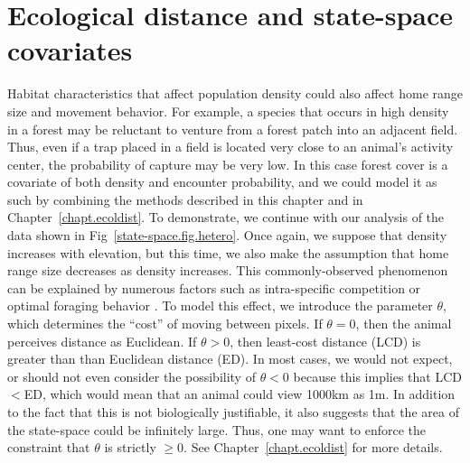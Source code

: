 \section{Ecological distance and state-space covariates}

Habitat characteristics that affect population
density could also affect home range size and movement behavior. For
example, a
species that occurs in high density in a forest may be reluctant to
venture from a forest patch into an adjacent field. Thus, even if a
trap placed in a field is located very close to an animal's activity
center, the probability of capture may be very low. In this case
forest cover is a covariate of both density and encounter probability,
and we could model it as such by combining the methods described in
this chapter and in Chapter~\ref{chapt.ecoldist}. To demonstrate, we
continue with our analysis of the data shown in
Fig~\ref{state-space.fig.hetero}. Once again, we suppose that density
increases with elevation, but this time, we also make the
assumption that home range size decreases as density increases. This
commonly-observed phenomenon can be explained by numerous factors such
as intra-specific competition \citep{sillett_etal:2004} or optimal
foraging behavior \citep{tufto_etal:1996,said_servanty:2005}. To model
this effect, we
introduce the parameter $\theta$, which determines the ``cost'' of
moving between pixels. If $\theta=0$, then the animal perceives
distance as Euclidean. If $\theta>0$, then least-cost distance (LCD)
is greater than than Euclidean distance (ED). In most cases, we would
not expect,
or should not even consider the possibility of $\theta<0$ because this
implies that LCD$<$ED, which would mean that an animal could view
1000km as 1m. In addition to the fact that this is not biologically
justifiable, it also suggests that the area of the state-space could
be infinitely large. Thus, one may want to enforce the constraint that
$\theta$ is strictly $\geq 0$. See Chapter~\ref{chapt.ecoldist} for
more details.

